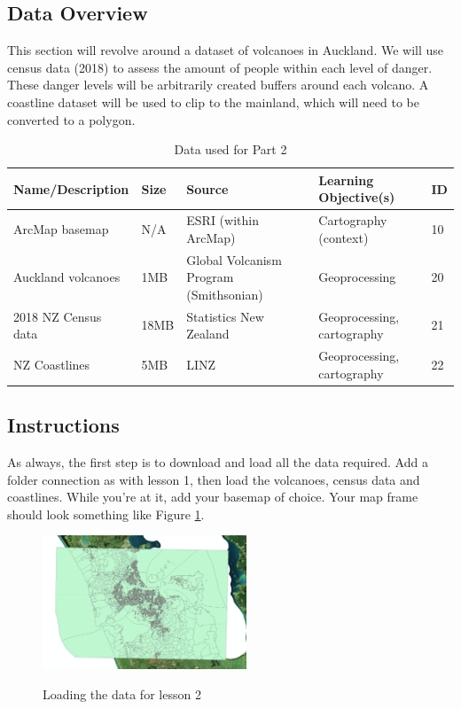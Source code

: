 \documentclass{article}
\begin{document}
\subsection{Data Overview}
This section will revolve around a dataset of volcanoes in Auckland. We will use census data (2018) to assess the amount of people within each level of danger. These danger levels will be arbitrarily created buffers around each volcano. A coastline dataset will be used to clip to the mainland, which will need to be converted to a polygon. \\

\begin{table}[h]
\begin{center}
    \begin{tabular}{ | m{4cm} | m{1cm}| m{3.5cm} | m{5cm} | m{1cm} | } 
    \hline
    \cellcolor{red!35!blue!33!green!33!}\textbf{Name/Description} & 
    \cellcolor{red!35!blue!33!green!33!}\textbf{Size} &
    \cellcolor{red!35!blue!33!green!33!}\textbf{Source} &
    \cellcolor{red!35!blue!33!green!33!}\textbf{Learning Objective(s)} &
    \cellcolor{red!35!blue!33!green!33!}\textbf{ID} \\
    \hline
    ArcMap basemap & N/A & ESRI (within ArcMap) & Cartography (context) & 10 \\
    \hline
    Auckland volcanoes & 1MB & Global Volcanism Program (Smithsonian) & Geoprocessing & 20 \\
    \hline
    2018 NZ Census data & 18MB & Statistics New Zealand & Geoprocessing, cartography & 21 \\
    \hline
    NZ Coastlines & 5MB & LINZ & Geoprocessing, cartography & 22 \\
    \hline
    \end{tabular}
\end{center}
\caption{\label{tb_data_2}Data used for Part 2}
\end{table}

\subsection{Instructions}
As always, the first step is to download and load all the data required. Add a folder connection as with lesson 1, then load the volcanoes, census data and coastlines. While you're at it, add your basemap of choice. Your map frame should look something like Figure \ref{2_rawdata}.

\begin{figure}[h]
  \centering
  \caption{Loading the data for lesson 2}
  \includegraphics[width=230px]{images/part2/rawdata.PNG}
  \label{2_rawdata}
\end{figure}
\pagebreak
\end{document}
